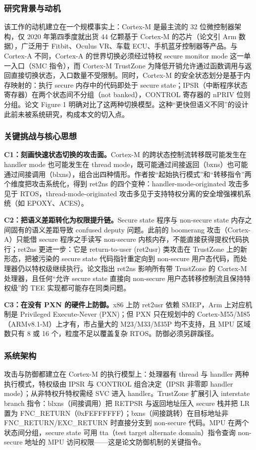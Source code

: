\documentclass[11pt]{ctexart}
\begin{document}
\subsubsection{研究背景与动机}
该工作的动机建立在一个规模事实上：Cortex-M 是最主流的 32 位微控制器架构，仅 2020 年第四季度就出货 44 亿颗基于 Cortex-M 的芯片（论文引 Arm 数据），广泛用于 Fitbit、Oculus VR、车载 ECU、手机蓝牙控制器等产品。与 Cortex-A 不同，Cortex-A 的世界切换必须经过特权 secure monitor mode 这一单一入口（SMC 指令），而 Cortex-M TrustZone 为降低开销允许通过函数调用与返回直接切换状态，入口数量不受限制。同时，Cortex-M 的安全状态划分是基于内存映射的：执行 secure 内存中的代码即处于 secure state；IPSR（中断程序状态寄存器）在两个状态间不分组（not banked），CONTROL 寄存器的 nPRIV 位则分组。论文 Figure 1 明确对比了这两种切换模型。这种``更快但语义不同''的设计此前未被系统研究，构成本文的切入点。\par
\subsubsection{关键挑战与核心思想}
\noindent\textbf{C1：刻画快速状态切换的攻击面。}Cortex-M 的跨状态控制流转移既可能发生在 handler mode 也可能发生在 thread mode，既可能通过间接返回（bxns）也可能通过间接调用（blxns），组合出四种情形。作者按``起始执行模式''和``转移指令''两个维度把攻击系统化，得到 ret2ns 的四个变种：handler-mode-originated 攻击多见于 RTOS，thread-mode-originated 攻击多见于支持特权分离的安全增强裸机系统（如 EPOXY、ACES）。\par
\noindent\textbf{C2：把语义差距转化为权限提升链。}Secure state 程序与 non-secure state 内存之间固有的语义差距导致 confused deputy 问题。此前的 boomerang 攻击（Cortex-A）只能借 secure 程序之手读写 non-secure 内核内存，不能直接获得提权代码执行；ret2ns 更进一步：它是 return-to-user (ret2usr) 类攻击在 TrustZone 上的新形态，把被污染的 secure state 代码指针重定向到 non-secure 用户态代码，而处理器仍以特权级继续执行。论文指出 ret2ns 影响所有带 TrustZone 的 Cortex-M 处理器，且任何``允许 secure state 直接向 non-secure 用户态转移控制流且保持特权级''的 TEE 实现都可能存在同类问题。\par
\noindent\textbf{C3：在没有 PXN 的硬件上防御。}x86 上防 ret2usr 依赖 SMEP，Arm 上对应机制是 Privileged Execute-Never (PXN)；但 PXN 只在规划中的 Cortex-M55/M85（ARMv8.1-M）上才有，市占量大的 M23/M33/M35P 均不支持，且 MPU 区域数只有 8 或 16 个，粒度不足以覆盖复杂 RTOS。防御必须另辟蹊径。\par
\subsubsection{系统架构}
攻击与防御都建立在 Cortex-M 的执行模型上：处理器有 thread 与 handler 两种执行模式，特权级由 IPSR 与 CONTROL 组合决定（IPSR 非零即 handler mode）；从非特权升特权需经 SVC 进入 handler。TrustZone 扩展引入 interstate branch 指令：blxns（间接调用）把 RETPSR 与返回地址压入 secure 栈并把 LR 置为 FNC\_RETURN（0xFEFFFFFF）；bxns（间接跳转）在目标地址非 FNC\_RETURN/EXC\_RETURN 时直接分支到 non-secure 代码。MPU 在两个状态间分组，secure state 可用 tta（test target alternate domain）指令查询 non-secure 地址的 MPU 访问权限——这是论文防御机制的关键指令。\par
\end{document}
